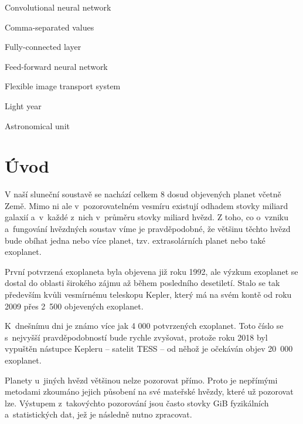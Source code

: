 \documentclass[a4paper,12pt]{article}
\begin{document}
\deskpage
\mainpage
\assignment
\statement
\acknowledgment
\annotationcs	
\annotationen
\content
\imglist
\tablelist
\codelist
\formulalist
\shortlist

\begin{description}[font=\mdseries,leftmargin=6em,labelwidth=!,]
\item[CNN]      Convolutional neural network
\item[csv]      Comma-separated values
\item[FC]       Fully-connected layer
\item[FFNN]     Feed-forward neural network
\item[fits]     Flexible image transport system
\item[ly]		Light year
\item[au]		Astronomical unit
\end{description}

\clearpage\pagestyle{plain}
\section*{Úvod}
\label{uvod}

V naší sluneční soustavě se nachází celkem 8 dosud objevených planet včetně Země. Mimo ni ale v~pozorovatelném vesmíru existují odhadem stovky miliard galaxií a~v~každé z~nich v~průměru stovky miliard hvězd. Z toho, co o~vzniku a~fungování hvězdných soustav víme je pravděpodobné, že většinu těchto hvězd bude obíhat jedna nebo více planet, tzv. extrasolárních planet nebo také exoplanet.~\cite{exoplanets}

První potvrzená exoplaneta byla objevena již roku 1992, ale výzkum exoplanet se dostal do oblasti širokého zájmu až během posledního desetiletí. Stalo se tak především kvůli vesmírnému teleskopu Kepler, který má na svém kontě od roku 2009 přes 2~500 objevených exoplanet.~\cite{kepler80,nasadata}

K~dnešnímu dni je známo více jak 4 000 potvrzených exoplanet. Toto číslo se s~nejvyšší pravděpodobností bude rychle zvyšovat, protože roku 2018 byl vypuštěn nástupce Kepleru -- satelit TESS -- od něhož je očekáván objev 20~000 exoplanet.~\cite{tess}

Planety u~jiných hvězd většinou nelze pozorovat přímo. Proto je nepřímými metodami zkoumáno jejich působení na své mateřské hvězdy, které už pozorovat lze. Výstupem z~takovýchto pozorování jsou často stovky GiB fyzikálních a~statistických dat, jež je následně nutno zpracovat.~\cite{exoplanets}
\end{document}
